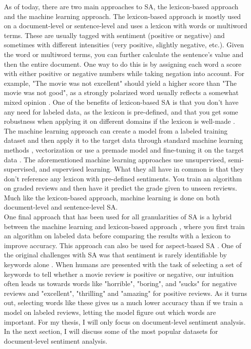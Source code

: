 As of today, there are two main approaches to SA, the lexicon-based approach and the machine learning approach. The lexicon-based approach is mostly used on a document-level or sentence-level and uses a lexicon with words or multiword terms. These are usually tagged with sentiment (positive or negative) and sometimes with different intensities (very positive, slightly negative, etc.). Given the word or multiword terms, you can further calculate the sentence's value and then the entire document. One way to do this is by assigning each word a score with either positive or negative numbers while taking negation into account. For example, "The movie was not excellent" should yield a higher score than "The movie was not good", as a strongly polarized word usually reflects a somewhat mixed opinion \cite{taboada-etal-2011-lexicon}. One of the benefits of lexicon-based SA is that you don't have any need for labeled data, as the lexicon is pre-defined, and that you get some robustness when applying it on different domains if the lexicon is well-made \cite{taboada-etal-2011-lexicon}.\\
The machine learning approach can create a model from a labeled training dataset and then apply it to the target data through standard machine learning methods \cite{pang-etal-2002-thumbs}, vectorization \cite{Peters:2018, mikolov2013efficient, pennington2014glove} or use a premade model and fine-tuning it on the target data \cite{devlin-etal-2019-bert}. The aforementioned machine learning approaches use unsupervised, semi-supervised, and supervised learning. What they all have in common is that they don't reference any lexicon with pre-defined sentiments. You train an algorithm on graded reviews and then have it predict the grade given to unseen reviews. Much like the lexicon-based approach, machine learning is done on both document-level and sentence-level SA.\\
One final approach that has been used for all granularities of SA is a hybrid between the machine learning and lexicon-based approach \cite{zhang2011combining}, where you first train an algorithm on labeled data before comparing the results with a lexicon to improve accuracy. This approach can also be used for aspect-based SA \cite{brun2016xrce}.
One of the original challenges with SA was that sentiment is rarely identifiable by keywords alone \cite{pang-etal-2002-thumbs}. When humans are presented with the task of selecting a set of keywords to tell whether a movie review is positive or negative, our intuition often leads us towards words like "horrible", "boring", and "sucks" for negative reviews and "excellent", "thrilling" and "amazing" for positive reviews. As it turns out, selecting words like these gives us a much lower accuracy than if we train a model on labeled reviews, letting the model figure out which words are important. For my thesis, I will only focus on document-level sentiment analysis. In the next section, I will discuss some of the most popular datasets for document-level sentiment analysis.

